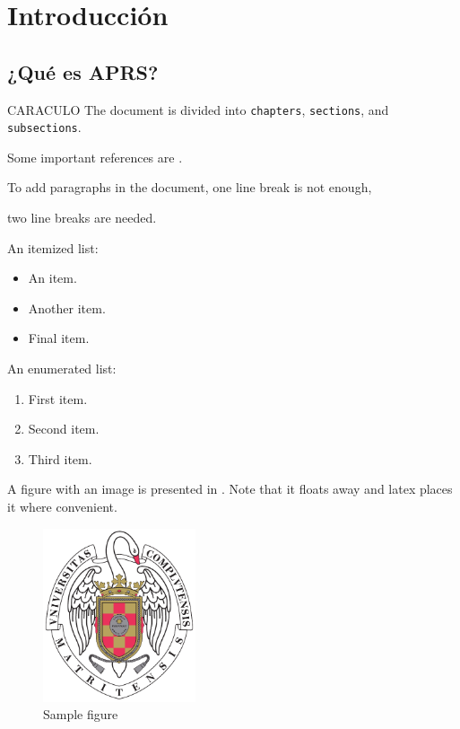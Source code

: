 \titlespacing*{\chapter}{0pt}{-1.25cm}{25pt}
\chapter{Introducción}
\section{¿Qué es APRS?}
		CARACULO The document is divided into \texttt{chapters}, \texttt{sections}, and \texttt{subsections}.

		Some important references are \cite{einstein,latexcompanion,knuthwebsite}.

		To add paragraphs in the document, 
		one line break is not enough,

		two line breaks are needed.

		An itemized list:

		\begin{itemize}
			\item An item.
			\item Another item.
			\item Final item.
		\end{itemize}

		An enumerated list:

		\begin{enumerate}
			\item First item.
			\item Second item.
			\item Third item.
		\end{enumerate}

		A figure with an image is presented in . Note that it floats away and latex places it where convenient.

		\begin{figure}[h!]
			\centering
			\includegraphics[width=0.4\textwidth]{./Images/escudo_ucm.pdf}
			\caption{Sample figure}
			\label{fig:logo_ucm}
		\end{figure}

